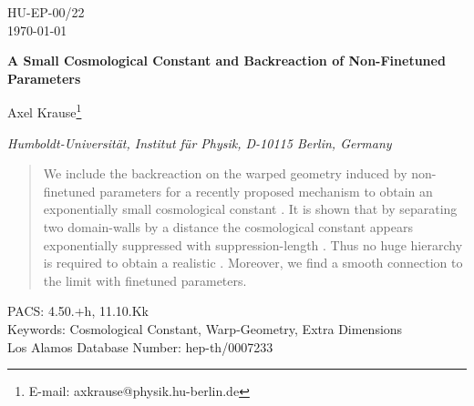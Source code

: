 \documentclass[a4paper,12pt]{article}
\begin{document}
\begin{titlepage}
\begin{flushright}
HU-EP-00/22 \\
\today
\end{flushright}

\vspace{1cm}
\begin{center}
\baselineskip25pt
{\Large\bf A Small Cosmological Constant and Backreaction of
           Non-Finetuned Parameters}
\end{center}
\vspace{1cm}
\begin{center}
\baselineskip12pt
{Axel Krause\footnote{E-mail: axkrause@physik.hu-berlin.de}}
\vspace{.3truecm}
\vspace{1cm}

{\it Humboldt-Universit\"{a}t, Institut f\"{u}r Physik, D-10115 Berlin,
     Germany}

\vspace{0.3cm}
\end{center}
\vspace*{\fill}

\begin{abstract}
We include the backreaction on the warped geometry induced by
non-finetuned parameters for a recently proposed mechanism to obtain
an exponentially small cosmological constant \coordHE{}. It is shown
that by separating two domain-walls by a distance \coordHE{} the
cosmological constant appears exponentially suppressed with
suppression-length \coordHE{}. Thus no huge hierarchy is required to obtain a
realistic \coordHE{}. Moreover, we find a smooth connection to the
limit with finetuned parameters.
\end{abstract}

\noindent
PACS: 4.50.+h, 11.10.Kk \\
Keywords: Cosmological Constant, Warp-Geometry, Extra Dimensions \\
Los Alamos Database Number: hep-th/0007233

\vspace*{\fill}

\end{titlepage}
\end{document}
